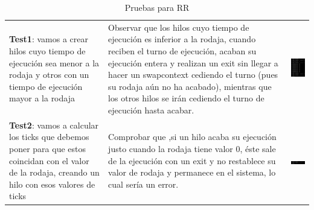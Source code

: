 \documentclass[10pt, spanish, pdftex]{template/UC3M_document}
\begin{document}
\begin{table}[h!]
    \centering
    \begin{tabular}{|C{0.2\textwidth}|C{0.35\textwidth}|C{0.35\textwidth}|}
    \hline
     &  &  \\ \hline
    \textbf{Test1}: vamos a crear hilos cuyo tiempo de ejecución sea menor a la rodaja y otros con un tiempo de ejecución mayor a la rodaja & Observar que los hilos cuyo tiempo de ejecución es inferior a la rodaja, cuando reciben el turno de ejecución, acaban su ejecución entera y realizan un exit sin llegar a hacer un swapcontext cediendo el turno (pues su rodaja aún no ha acabado), mientras que los otros hilos se irán cediendo el turno de ejecución hasta acabar. & \includegraphics[width=4cm]{arboles/test1.png} \\ \hline
    \textbf{Test2}: vamos a calcular los ticks que debemos poner para que estos coincidan con el valor de la rodaja, creando un hilo con esos valores de ticks & Comprobar que ,si un hilo acaba su ejecución justo cuando la rodaja tiene valor 0, éste sale de la ejecución con un exit y no restablece su valor de rodaja y permanece en el sistema, lo cual sería un error. & \includegraphics[width=5.5cm]{arboles/test2.png} \\\hline
    \end{tabular}
    \caption{Pruebas para RR}
    \label{fig:resultRR}
\end{table}
\end{document}
